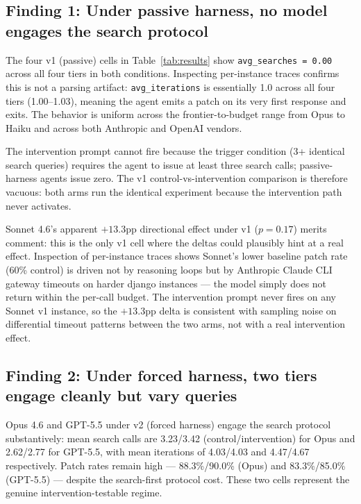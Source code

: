 \documentclass[journal]{IEEEtran}
\begin{document}
\subsection{Finding 1: Under passive harness, no model engages the search protocol}

The four v1 (passive) cells in Table~\ref{tab:results} show \texttt{avg\_searches = 0.00} across all four tiers in both conditions. Inspecting per-instance traces confirms this is not a parsing artifact: \texttt{avg\_iterations} is essentially 1.0 across all four tiers (1.00--1.03), meaning the agent emits a patch on its very first response and exits. The behavior is uniform across the frontier-to-budget range from Opus to Haiku and across both Anthropic and OpenAI vendors.

The intervention prompt cannot fire because the trigger condition (3+ identical search queries) requires the agent to issue at least three search calls; passive-harness agents issue zero. The v1 control-vs-intervention comparison is therefore vacuous: both arms run the identical experiment because the intervention path never activates.

Sonnet 4.6's apparent $+13.3$pp directional effect under v1 ($p=0.17$) merits comment: this is the only v1 cell where the deltas could plausibly hint at a real effect. Inspection of per-instance traces shows Sonnet's lower baseline patch rate (60\% control) is driven not by reasoning loops but by Anthropic Claude CLI gateway timeouts on harder django instances — the model simply does not return within the per-call budget. The intervention prompt never fires on any Sonnet v1 instance, so the $+13.3$pp delta is consistent with sampling noise on differential timeout patterns between the two arms, not with a real intervention effect.

\subsection{Finding 2: Under forced harness, two tiers engage cleanly but vary queries}

Opus 4.6 and GPT-5.5 under v2 (forced harness) engage the search protocol substantively: mean search calls are 3.23/3.42 (control/intervention) for Opus and 2.62/2.77 for GPT-5.5, with mean iterations of 4.03/4.03 and 4.47/4.67 respectively. Patch rates remain high — 88.3\%/90.0\% (Opus) and 83.3\%/85.0\% (GPT-5.5) — despite the search-first protocol cost. These two cells represent the genuine intervention-testable regime.
\end{document}

